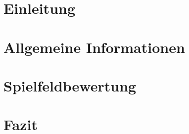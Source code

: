 \documentclass[12pt,a4paper,bibliography=totocnumbered,listof=totocnumbered]{article}
\begin{document}
\section{Einleitung}\label{sec:einleitung}


\section{Allgemeine Informationen}\label{sec:allgemeine-informationen}


\section{Spielfeldbewertung}\label{sec:spielfeldbewertung}


\section{Fazit}\label{sec:fazit}


%
\end{document}
